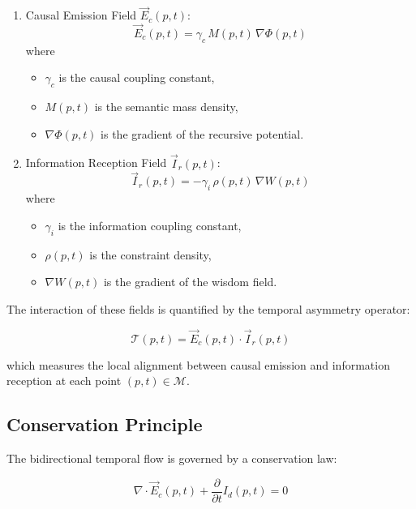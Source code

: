 \begin{enumerate}
    \item Causal Emission Field \(\vec{E}_c(p,t)\):
    \begin{equation}
    \vec{E}_c(p,t) = \gamma_c\, M(p,t)\, \nabla\Phi(p,t)
    \end{equation}
    where
    \begin{itemize}
        \item \(\gamma_c\) is the causal coupling constant,
        \item \(M(p,t)\) is the semantic mass density,
        \item \(\nabla\Phi(p,t)\) is the gradient of the recursive potential.
    \end{itemize}

    \item Information Reception Field \(\vec{I}_r(p,t)\):
    \begin{equation}
    \vec{I}_r(p,t) = -\gamma_i\, \rho(p,t)\, \nabla W(p,t)
    \end{equation}
    where
    \begin{itemize}
        \item \(\gamma_i\) is the information coupling constant,
        \item \(\rho(p,t)\) is the constraint density,
        \item \(\nabla W(p,t)\) is the gradient of the wisdom field.
    \end{itemize}
\end{enumerate}

The interaction of these fields is quantified by the temporal asymmetry operator:

\begin{equation}
\mathcal{T}(p,t) = \vec{E}_c(p,t) \cdot \vec{I}_r(p,t)
\end{equation}

which measures the local alignment between causal emission and information reception at each point \((p,t) \in \mathcal{M}\).

\subsection{Conservation Principle}

The bidirectional temporal flow is governed by a conservation law:

\begin{equation}
\nabla \cdot \vec{E}_c(p,t) + \frac{\partial}{\partial t} I_d(p,t) = 0
\end{equation}

